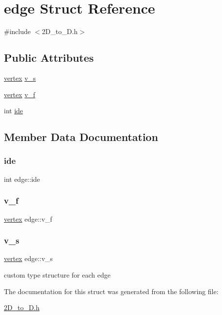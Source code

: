 \hypertarget{structedge}{}\section{edge Struct Reference}
\label{structedge}


{\ttfamily \#include $<$2\+D\+\_\+to\+\_\+D.\+h$>$}

\subsection*{Public Attributes}
\begin{DoxyCompactItemize}
\item 
\mbox{\hyperlink{structvertex}{vertex}} \mbox{\hyperlink{structedge_af7596e53bed95953f5e0ce38d82a1b3a}{v\+\_\+s}}
\item 
\mbox{\hyperlink{structvertex}{vertex}} \mbox{\hyperlink{structedge_ae6a5986bf7cb1d5e434b5e872d126490}{v\+\_\+f}}
\item 
int \mbox{\hyperlink{structedge_a3ef1ac22c48d4d241b4695c9e6bdc22d}{ide}}
\end{DoxyCompactItemize}


\subsection{Member Data Documentation}
\mbox{\label{structedge_a3ef1ac22c48d4d241b4695c9e6bdc22d}} 
\subsubsection{\texorpdfstring{ide}{ide}}
{\footnotesize\ttfamily int edge\+::ide}

\mbox{\label{structedge_ae6a5986bf7cb1d5e434b5e872d126490}} 
\subsubsection{\texorpdfstring{v\+\_\+f}{v\_f}}
{\footnotesize\ttfamily \mbox{\hyperlink{structvertex}{vertex}} edge\+::v\+\_\+f}

\mbox{\label{structedge_af7596e53bed95953f5e0ce38d82a1b3a}} 
\subsubsection{\texorpdfstring{v\+\_\+s}{v\_s}}
{\footnotesize\ttfamily \mbox{\hyperlink{structvertex}{vertex}} edge\+::v\+\_\+s}

custom type structure for each edge 

The documentation for this struct was generated from the following file\+:\begin{DoxyCompactItemize}
\item 
\mbox{\hyperlink{2_d__to__3_d_8h}{2\+D\+\_\+to\+\_\+D.\+h}}\end{DoxyCompactItemize}
